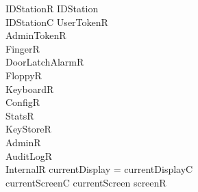 \begin{schema}{IDStationR}
        IDStation
\\      IDStationC        
\also
	UserTokenR
\\	AdminTokenR
\\	FingerR
\\	DoorLatchAlarmR
\\      FloppyR
\\      KeyboardR
\\      ConfigR
\\      StatsR
\\      KeyStoreR
\\      AdminR
\\      AuditLogR
\\      InternalR
\where
        currentDisplay = currentDisplayC
\\      currentScreenC \mapsto currentScreen \in screenR 
\end{schema}







